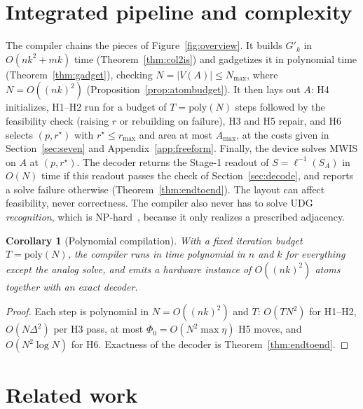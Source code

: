 \documentclass[a4paper,fleqn]{cas-sc}
\newtheorem{corollary}[theorem]{Corollary}
\newcommand{\Nmax}{N_{\max}}
\begin{document}
\section{Integrated pipeline and complexity}
\label{sec:pipeline}

The compiler chains the pieces of Figure~\ref{fig:overview}. It builds $G'_k$ in
$O(nk^2+mk)$ time (Theorem~\ref{thm:col2is}) and gadgetizes it in polynomial time
(Theorem~\ref{thm:gadget}), checking $N=|V(A)|\le\Nmax$, where $N=O((nk)^2)$
(Proposition~\ref{prop:atombudget}). It then lays out $A$: H4 initializes, H1--H2 run
for a budget of $T=\mathrm{poly}(N)$ steps followed by the feasibility check (raising
$r$ or rebuilding on failure), H3 and H5 repair, and H6 selects $(p,r^\star)$ with
$r^\star\le r_{\max}$ and area at most $A_{\max}$, at the costs given in
Section~\ref{sec:seven} and Appendix~\ref{app:freeform}. Finally, the device solves MWIS on $A$ at $(p,r^\star)$. The
decoder returns the Stage-1 readout of $S=\ell^{-1}(S_A)$ in $O(N)$ time if this
readout passes the check of Section~\ref{sec:decode}, and reports a solve failure
otherwise (Theorem~\ref{thm:endtoend}). The layout can affect feasibility, never
correctness. The compiler also never has to solve UDG \emph{recognition}, which is
NP-hard~\cite{Breu1998}, because it only realizes a prescribed adjacency.

\begin{corollary}[Polynomial compilation]
\label{prop:polytime}
With a fixed iteration budget $T=\mathrm{poly}(N)$, the compiler runs in time
polynomial in $n$ and $k$ for everything except the analog solve, and emits a hardware
instance of $O((nk)^2)$ atoms together with an exact decoder.
\end{corollary}

\begin{proof}
Each step is polynomial in $N=O((nk)^2)$ and $T$: $O(TN^2)$ for H1--H2,
$O(N\Delta^2)$ per H3 pass, at most $\Phi_0=O(N^2\max\eta)$ H5 moves, and
$O(N^2\log N)$ for H6. Exactness of the decoder is Theorem~\ref{thm:endtoend}.
\end{proof}

\section{Related work}
\label{sec:related}
\end{document}

